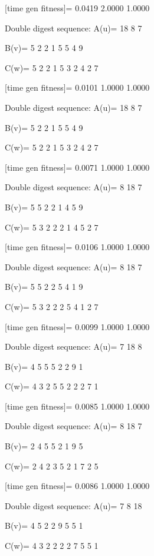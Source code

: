 [time gen fitness]=
    0.0419    2.0000    1.0000

Double digest sequence:
A(u)=
    18     8     7

B(v)=
     5     2     2     1     5     5     4     9

C(w)=
     5     2     2     1     5     3     2     4     2     7

[time gen fitness]=
    0.0101    1.0000    1.0000

Double digest sequence:
A(u)=
    18     8     7

B(v)=
     5     2     2     1     5     5     4     9

C(w)=
     5     2     2     1     5     3     2     4     2     7

[time gen fitness]=
    0.0071    1.0000    1.0000

Double digest sequence:
A(u)=
     8    18     7

B(v)=
     5     5     2     2     1     4     5     9

C(w)=
     5     3     2     2     2     1     4     5     2     7

[time gen fitness]=
    0.0106    1.0000    1.0000

Double digest sequence:
A(u)=
     8    18     7

B(v)=
     5     5     2     2     5     4     1     9

C(w)=
     5     3     2     2     2     5     4     1     2     7

[time gen fitness]=
    0.0099    1.0000    1.0000

Double digest sequence:
A(u)=
     7    18     8

B(v)=
     4     5     5     5     2     2     9     1

C(w)=
     4     3     2     5     5     2     2     2     7     1

[time gen fitness]=
    0.0085    1.0000    1.0000

Double digest sequence:
A(u)=
     8    18     7

B(v)=
     2     4     5     5     2     1     9     5

C(w)=
     2     4     2     3     5     2     1     7     2     5

[time gen fitness]=
    0.0086    1.0000    1.0000

Double digest sequence:
A(u)=
     7     8    18

B(v)=
     4     5     2     2     9     5     5     1

C(w)=
     4     3     2     2     2     2     7     5     5     1

